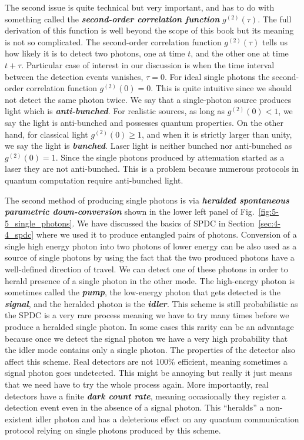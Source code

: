 The second issue is quite technical but very important, and has to do with something called the \textit{\textbf{second-order correlation function}} $g^{(2)}(\tau)$.
The full derivation of this function is well beyond the scope of this book but its meaning is not so complicated.
The second-order correlation function $g^{(2)}(\tau)$ tells us how likely it is to detect two photons, one at time $t$, and the other one at time $t+\tau$.
Particular case of interest in our discussion is when the time interval between the detection events vanishes, $\tau = 0$.
For ideal single photons the second-order correlation function $g^{(2)}(0) = 0$.
This is quite intuitive since we should not detect the same photon twice.
We say that a single-photon source produces light which is \textit{\textbf{anti-bunched}}.
For realistic sources, as long as $g^{(2)}(0) < 1$, we say the light is anti-bunched and possesses quantum properties.
On the other hand, for classical light $g^{(2)}(0) \geq 1$, and when it is strictly larger than unity, we say the light is \textit{\textbf{bunched}}.
Laser light is neither bunched nor anti-bunched as $g^{(2)}(0)=1$.
Since the single photons produced by attenuation started as a laser they are not anti-bunched.
This is a problem because numerous protocols in quantum computation require anti-bunched light.

The second method of producing single photons is via \textit{\textbf{heralded spontaneous parametric down-conversion}} shown in the lower left panel of Fig.~\ref{fig:5-5_single_photons}.
We have discussed the basics of SPDC in Section~\ref{sec:4-4_spdc} where we used it to produce entangled pairs of photons.
Conversion of a single high energy photon into two photons of lower energy can be also used as a source of single photons by using the fact that the two produced photons have a well-defined direction of travel.
We can detect one of these photons in order to herald presence of a single photon in the other mode.
The high-energy photon is sometimes called the \textit{\textbf{pump}}, the low-energy photon that gets detected is the \textit{\textbf{signal}}, and the heralded photon is the \textit{\textbf{idler}}.
This scheme is still probabilistic as the SPDC is a very rare process meaning we have to try many times before we produce a heralded single photon.
In some cases this rarity can be an advantage because once we detect the signal photon we have a very high probability that the idler mode contains only a single photon.
The properties of the detector also affect this scheme.
Real detectors are not 100\% efficient, meaning sometimes a signal photon goes undetected.
This might be annoying but really it just means that we need have to try the whole process again.
More importantly, real detectors have a finite \textit{\textbf{dark count rate}}, meaning occasionally they register a detection event even in the absence of a signal photon.
This ``heralds'' a non-existent idler photon and has a deleterious effect on any quantum communication protocol relying on single photons produced by this scheme.

